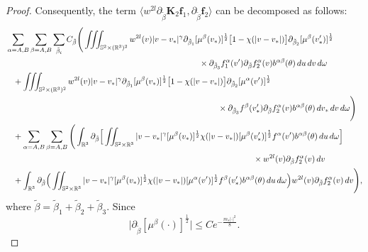 \documentclass[reqno]{amsart}
\numberwithin{equation}{section}
\numberwithin{equation}{section}
\begin{document}
\begin{proof}
		Consequently, the term $\langle w^{2l} \partial_{\tilde{\beta}} \mathbf{K}_2 \mathbf{f}_1, \partial_{\tilde{\beta}} \mathbf{f}_2 \rangle$ can be decomposed as follows:
			\begin{align}
			&\sum_{\alpha=A,B}\sum_{\beta=A,B}\sum_{\tilde{\beta}_{i}}C_{\tilde{\beta}}\Bigg(\iiint_{\mathbb{S}^2\times(\mathbb{R}^3)^2} w^{2l}(v) |v-v_*|^{\gamma} \partial_{\tilde{\beta}_1}[\mu^{\beta}(v_*)]^{\frac{1}{2}}\big[1-\chi(|v-v_*|)\big]\partial_{\tilde{\beta}_2}[\mu^{\beta}(v_*')]^{\frac{1}{2}}\notag\\
			&\hspace{8.2cm}\times \partial_{\tilde{\beta}_3}f^\alpha_1(v')\partial_{\tilde{\beta}}f^\alpha_2(v)b^{ \alpha \beta}(\theta) \, du \,dv\, d\omega \label{sma248}\\
			&\hspace{0.3cm}+ \iiint_{\mathbb{S}^2\times(\mathbb{R}^3)^2} w^{2l}(v) |v-v_*|^{\gamma} \partial_{\tilde{\beta}_1}[\mu^{\beta}(v_*)]^{\frac{1}{2}}\big[1-\chi(|v-v_*|)\big]\partial_{\tilde{\beta}_2}[\mu^{\alpha}(v')]^{\frac{1}{2}}\notag\\
			&\hspace{9cm}\times \partial_{\tilde{\beta}_3}f^\beta(v_*')\partial_{\tilde{\beta}}f^\alpha_2(v)b^{ \alpha \beta}(\theta) \, dv_* \, dv\, d\omega \Bigg)\label{sma249}\\
			&\hspace{0.3cm}+\sum_{\alpha=A,B}\sum_{\beta=A,B}\Bigg(\int_{\mathbb{R}^3} \partial_{\tilde{\beta}}\Big[\iint_{\mathbb{S}^2\times\mathbb{R}^3}|v-v_*|^{\gamma} [\mu^{\beta}(v_*)]^{\frac{1}{2}}\chi(|v-v_*|)[\mu^{\beta}(v_*')]^{\frac{1}{2}} f^\alpha(v')b^{ \alpha \beta}(\theta) \, du \, d\omega \Big]\notag\\
				&\hspace{10.5cm}\times w^{2l}(v) \partial_{\tilde{\beta}}f^\alpha_2(v) \, dv\label{bga250}\\
			&\hspace{0.3cm}+ \int_{\mathbb{R}^3} \partial_{\tilde{\beta}}\Big( \iint_{\mathbb{S}^2\times\mathbb{R}^3} |v-v_*|^{\gamma} [\mu^{\beta}(v_*)]^{\frac{1}{2}}\chi(|v-v_*|)[\mu^{\alpha}(v')]^{\frac{1}{2}}
			 f^\beta(v_*')b^{ \alpha \beta}(\theta) \, du \, d\omega \Big)
			 w^{2l}(v) \partial_{\tilde{\beta}}f^\alpha_2(v) \, dv\Bigg), \label{bga251}
		\end{align}
		where $\tilde{\beta}=\tilde{\beta}_1+\tilde{\beta}_2+\tilde{\beta}_3$. Since 
		\begin{equation*}
			\big|\partial_{\tilde{\beta}}[\mu^{\beta}(\cdot)]^{\frac{1}{2}}\big| \leq C e^{-\frac{m_s|\cdot|^2}{8}}.

\end{equation*}
\end{proof}
\end{document}
